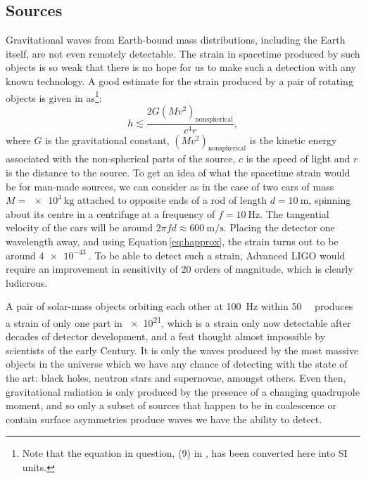 \subsection{Sources}
Gravitational waves from Earth-bound mass distributions, including the Earth itself, are not even remotely detectable. The strain in spacetime produced by such objects is so weak that there is no hope for us to make such a detection with any known technology. A good estimate for the strain produced by a pair of rotating objects is given in \cite{Sathyaprakash2009} as\footnote{Note that the equation in question, (9) in \cite{Sathyaprakash2009}, has been converted here into SI units.}:
\begin{equation}
  \label{eq:happrox}
  h \lesssim \frac{2 G \left( M v^{2} \right)_{\text{nonspherical}}}{c^4 r},
\end{equation}
where $G$ is the gravitational constant, $\left( M v^{2} \right)_{\text{nonspherical}}$ is the kinetic energy associated with the non-spherical parts of the source, $c$ is the speed of light and $r$ is the distance to the source. To get an idea of what the spacetime strain would be for man-made sources, we can consider as in \cite{Sathyaprakash2009} the case of two cars of mass $M = \SI{e3}{\kilo\gram}$ attached to opposite ends of a rod of length $d = \SI{10}{\meter}$, spinning about its centre in a centrifuge at a frequency of $f = \SI{10}{\hertz}$. The tangential velocity of the cars will be around $2 \pi f d \approx \SI{600}{\meter\per\second}$. Placing the detector one wavelength away, and using Equation\,\ref{eq:happrox}, the strain turns out to be around $\SI{4e-43}{}$. To be able to detect such a strain, Advanced LIGO would require an improvement in sensitivity of \SI{20}{} orders of magnitude, which is clearly ludicrous.

A pair of solar-mass objects orbiting each other at \SI{100}{\hertz} within \SI{50}{\mega\lightyear} produces a strain of only one part in \SI{e21}{}, which is a strain only now detectable after decades of detector development, and a feat thought almost impossible by scientists of the early  Century. It is only the waves produced by the most massive objects in the universe which we have any chance of detecting with the state of the art: black holes, neutron stars and supernovae, amongst others. Even then, gravitational radiation is only produced by the presence of a changing quadrupole moment, and so only a subset of sources that happen to be in coalescence or contain surface asymmetries produce waves we have the ability to detect.

